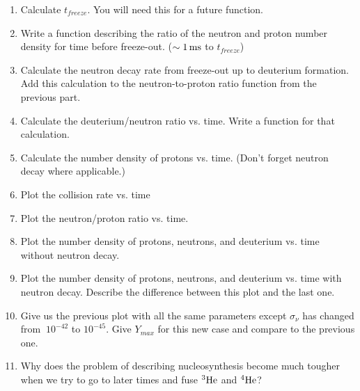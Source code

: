 \documentclass[12pt,preprint]{aastex}
\def\ms{\,{\rm ms}}
\begin{document}
\begin{enumerate}
\begin{enumerate}
	\item Calculate $t_{freeze}$. You will need this for a future function.
	 
	\item Write a function describing the ratio of the neutron and proton number density for time before freeze-out. ($\sim 1\ms$ to $t_{freeze}$) 
	
	\item Calculate the neutron decay rate from freeze-out up to deuterium formation. Add this calculation to the neutron-to-proton ratio function from the previous part. 
	
	\item Calculate the deuterium/neutron ratio vs. time. Write a function for that calculation. 
	
	\item Calculate the number density of protons vs. time. (Don't forget neutron decay where applicable.) 
	
	\item Plot the collision rate vs. time
	
	\item Plot the neutron/proton ratio vs. time. 
	
	\item Plot the number density of protons, neutrons, and deuterium vs. time without neutron decay.
	
	\item Plot the number density of protons, neutrons, and deuterium vs. time with neutron decay. Describe the difference between this plot and the last one.
	
	\item Give us the previous plot with all the same parameters except $\sigma_{\nu}$ has changed from $~ 10^{-42}$ to $10^{-45}$. Give $Y_{max}$ for this new case and compare to the previous one.
	
	\item Why does the problem of describing nucleosynthesis become much tougher when we try to go to later times and fuse $\rm{^3He}$ and $\rm{^4He}$? 

\end{enumerate}

\end{enumerate}
\end{document}
